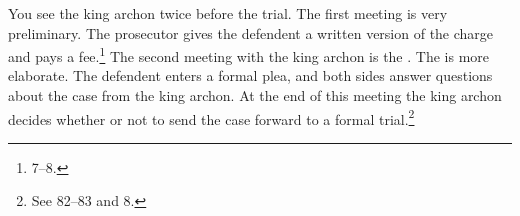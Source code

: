 \documentclass[10pt]{article}
\begin{document}
You see the king archon twice before the trial. The first meeting is very
preliminary. The prosecutor gives the defendent a written version of the
charge and pays a fee.\footnote{\citet{brickhouse2004} 7--8.} The second
meeting with the king archon is the . The
 is more elaborate. The defendent enters a formal plea,
and both sides answer questions about the case from the king archon.  At the
end of this meeting the king archon decides whether or not to send the case
forward to a formal trial.\footnote{See \citet{burnet1924} 82--83 and
\citet{brickhouse2004} 8.}



\end{document}

